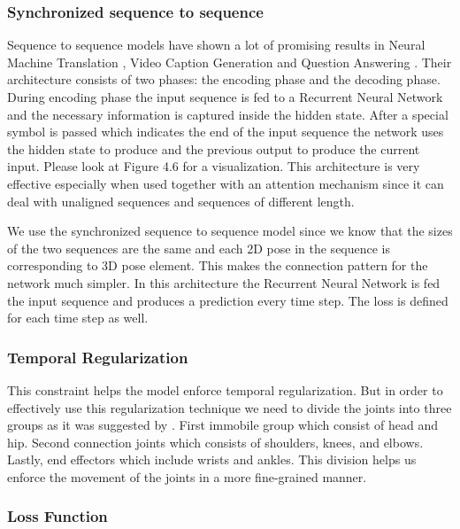 \subsubsection{Synchronized sequence to sequence}

Sequence to sequence models \parencite{sutskever2014sequence} have shown a lot of promising results in Neural Machine Translation \parencite{bahdanau2014neural}, Video Caption Generation \parencite{xu2015show} and Question Answering \parencite{hermann2015teaching}. Their architecture consists of two phases: the encoding phase and the decoding phase. During encoding phase the input sequence is fed to a Recurrent Neural Network and the necessary information is captured inside the hidden state. After a special  symbol is passed which indicates the end of the input sequence the network uses the hidden state to produce and the previous output to produce the current input. Please look at Figure 4.6 for a visualization. This architecture is very effective especially when used together with an attention mechanism since it can deal with unaligned sequences and sequences of different length.

We use the synchronized sequence to sequence model since we know that the sizes of the two sequences are the same and each 2D pose in the sequence is corresponding to 3D pose element. This makes the connection pattern for the network much simpler. In this architecture the Recurrent Neural Network is fed the input sequence and produces a prediction every time step. The loss is defined for each time step as well.

\subsubsection{Temporal Regularization}

This constraint helps the model enforce temporal regularization. But in order to effectively use this regularization technique we need to divide the joints into three groups as it was suggested by \parencite{hossain2017understanding}. First immobile group which consist of head and hip. Second connection joints which consists of shoulders, knees, and elbows. Lastly, end effectors which include wrists and ankles. This division helps us enforce the movement of the joints in a more fine-grained manner.

\subsubsection{Loss Function}

